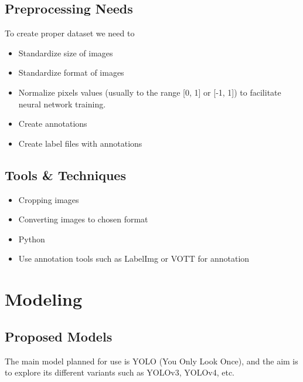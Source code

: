 \documentclass[12pt,a4paper]{article}
\begin{document}
\subsection{Preprocessing Needs}
To create proper dataset we need to 
\begin{itemize}
    \item Standardize size of images
    \item Standardize format of images
    \item Normalize pixels values (usually to the range [0, 1] or [-1, 1]) to facilitate neural network training.
    \item Create annotations
    \item Create label files with annotations
\end{itemize}
\subsection{Tools \& Techniques}
\begin{itemize}
    \item Cropping images
    \item Converting images to chosen format
    \item Python
    \item Use annotation tools such as LabelImg or VOTT for annotation
\end{itemize}

\section{Modeling}
\subsection{Proposed Models}
The main model planned for use is YOLO (You Only Look Once), and the aim is to explore its different variants such as YOLOv3, YOLOv4, etc.
\end{document}
